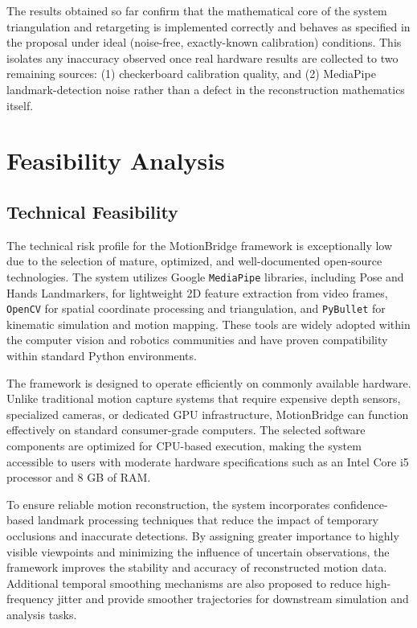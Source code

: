 The results obtained so far confirm that the mathematical core of the
system  triangulation and retargeting  is implemented correctly and
behaves as specified in the proposal under ideal (noise-free,
exactly-known calibration) conditions. This isolates any inaccuracy
observed once real hardware results are collected to two remaining
sources: (1) checkerboard calibration quality, and (2) MediaPipe
landmark-detection noise rather than a defect in the reconstruction
mathematics itself.

\section{Feasibility Analysis}
\subsection{Technical Feasibility}

The technical risk profile for the MotionBridge framework is exceptionally low due to the selection of mature, optimized, and well-documented open-source technologies. The system utilizes Google \texttt{MediaPipe} libraries, including Pose and Hands Landmarkers, for lightweight 2D feature extraction from video frames, \texttt{OpenCV} for spatial coordinate processing and triangulation, and \texttt{PyBullet} for kinematic simulation and motion mapping. These tools are widely adopted within the computer vision and robotics communities and have proven compatibility within standard Python environments.

The framework is designed to operate efficiently on commonly available hardware. Unlike traditional motion capture systems that require expensive depth sensors, specialized cameras, or dedicated GPU infrastructure, MotionBridge can function effectively on standard consumer-grade computers. The selected software components are optimized for CPU-based execution, making the system accessible to users with moderate hardware specifications such as an Intel Core i5 processor and 8 GB of RAM.

To ensure reliable motion reconstruction, the system incorporates confidence-based landmark processing techniques that reduce the impact of temporary occlusions and inaccurate detections. By assigning greater importance to highly visible viewpoints and minimizing the influence of uncertain observations, the framework improves the stability and accuracy of reconstructed motion data. Additional temporal smoothing mechanisms are also proposed to reduce high-frequency jitter and provide smoother trajectories for downstream simulation and analysis tasks.

